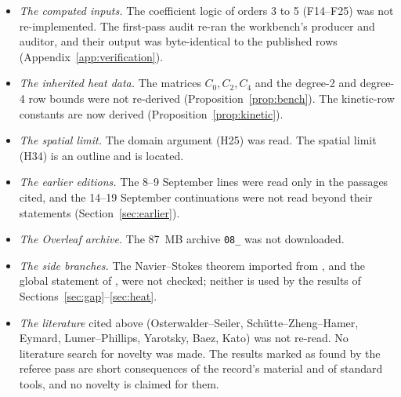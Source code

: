 \begin{itemize}
\item \emph{The computed inputs.} The coefficient logic of orders 3 to 5 (F14--F25) was not re-implemented. The first-pass audit re-ran the workbench's producer and auditor, and their output was byte-identical to the published rows (Appendix~\ref{app:verification}).
\item \emph{The inherited heat data.} The matrices $C_0,C_2,C_4$ and the degree-2 and degree-4 row bounds were not re-derived (Proposition~\ref{prop:bench}). The kinetic-row constants are now derived (Proposition~\ref{prop:kinetic}).
\item \emph{The spatial limit.} The domain argument (H25) was read. The spatial limit (H34) is an outline and is located.
\item \emph{The earlier editions.} The 8--9 September lines were read only in the passages cited, and the 14--19 September continuations were not read beyond their statements (Section~\ref{sec:earlier}).
\item \emph{The Overleaf archive.} The 87~MB archive \texttt{08\_} was not downloaded.
\item \emph{The side branches.} The Navier--Stokes theorem imported from \cite{OpenAINS}, and the global statement of \cite{AlpogeS6}, were not checked; neither is used by the results of Sections~\ref{sec:gap}--\ref{sec:heat}.
\item \emph{The literature} cited above (Osterwalder--Seiler, Schütte--Zheng--Hamer, Eymard, Lumer--Phillips, Yarotsky, Baez, Kato) was not re-read. No literature search for novelty was made. The results marked as found by the referee pass are short consequences of the record's material and of standard tools, and no novelty is claimed for them.
\end{itemize}
